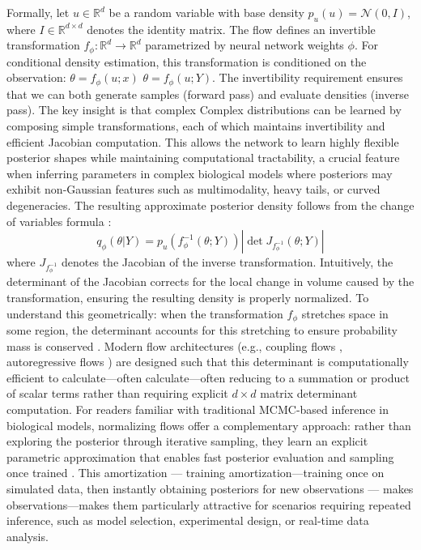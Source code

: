 \documentclass{article}
\providecommand{\DIFaddtex}[1]{{\protect\color{blue} \sf #1}} %
\providecommand{\DIFdeltex}[1]{{\protect\color{red} \scriptsize #1}} %
\providecommand{\DIFaddbegin}{} %
\providecommand{\DIFaddend}{} %
\providecommand{\DIFdelbegin}{} %
\providecommand{\DIFdelend}{} %
\providecommand{\DIFadd}[1]{\texorpdfstring{\DIFaddtex{#1}}{#1}} %
\providecommand{\DIFdel}[1]{\texorpdfstring{\DIFdeltex{#1}}{}} %
\newcommand{\DIFscaledelfig}{0.5}
\newlength{\DIFdelgraphicswidth} %
\newlength{\DIFdelgraphicsheight} %
\newcommand{\DIFaddincludegraphics}[2][]{{\color{blue}\fbox{\DIFOincludegraphics[#1]{#2}}}} %
\newcommand{\DIFdelincludegraphics}[2][]{%
\sbox{\DIFdelgraphicsbox}{\DIFOincludegraphics[#1]{#2}}%
\settoboxwidth{\DIFdelgraphicswidth}{\DIFdelgraphicsbox} %
\settoboxtotalheight{\DIFdelgraphicsheight}{\DIFdelgraphicsbox} %
\scalebox{\DIFscaledelfig}{%
\parbox[b]{\DIFdelgraphicswidth}{\usebox{\DIFdelgraphicsbox}\\[-\baselineskip] \rule{\DIFdelgraphicswidth}{0em}}\llap{\resizebox{\DIFdelgraphicswidth}{\DIFdelgraphicsheight}{%
\setlength{\unitlength}{\DIFdelgraphicswidth}%
\begin{picture}(1,1)%
\thicklines\linethickness{2pt} %
{\color[rgb]{1,0,0}\put(0,0){\framebox(1,1){}}}%
{\color[rgb]{1,0,0}\put(0,0){\line( 1,1){1}}}%
{\color[rgb]{1,0,0}\put(0,1){\line(1,-1){1}}}%
\end{picture}%
}\hspace*{3pt}}} %
} %
\DeclareRobustCommand{\DIFaddbegin}{\DIFOaddbegin \let\includegraphics\DIFaddincludegraphics} %
\DeclareRobustCommand{\DIFaddend}{\DIFOaddend \let\includegraphics\DIFOincludegraphics} %
\DeclareRobustCommand{\DIFdelbegin}{\DIFOdelbegin \let\includegraphics\DIFdelincludegraphics} %
\DeclareRobustCommand{\DIFdelend}{\DIFOaddend \let\includegraphics\DIFOincludegraphics} %
\begin{document}
Formally, let $u \in \mathbb{R}^d$ be a random variable with base density $p_u(u) = \mathcal{N}(0, I)$, where $I \in \mathbb{R}^{d \times d}$ denotes the identity matrix. The flow defines an invertible transformation $f_\phi: \mathbb{R}^d \rightarrow \mathbb{R}^d$ parametrized by neural network weights $\phi$. For conditional density estimation, this transformation is conditioned on the observation: \DIFdelbegin \DIFdel{$\theta = f_\phi(u; x)$}\DIFdelend \DIFaddbegin \DIFadd{$\theta = f_\phi(u; Y)$}\DIFaddend . The invertibility requirement ensures that we can both generate samples (forward pass) and evaluate densities (inverse pass). \DIFdelbegin \DIFdel{The key insight is that complex }\DIFdelend \DIFaddbegin \DIFadd{Complex }\DIFaddend distributions can be learned by composing simple transformations, each of which maintains invertibility and efficient Jacobian computation. This allows the network to learn highly flexible posterior shapes while maintaining computational tractability, a crucial feature when inferring parameters in complex biological models where posteriors may exhibit non-Gaussian features such as multimodality, heavy tails, or curved degeneracies. The resulting approximate posterior density follows from the change of variables formula
\DIFdelbegin \DIFdel{:
}\DIFdelend \begin{equation}
	q_\phi(\theta | Y) = p_u(f_\phi^{-1}(\theta;Y)) \left| \det J_{f_\phi^{-1}}(\theta; Y) \right|
\end{equation}
where $J_{f_\phi^{-1}}$ denotes the Jacobian of the inverse transformation. Intuitively, the determinant of the Jacobian corrects for the local change in volume caused by the transformation, ensuring the resulting density is properly normalized. To understand this geometrically: when the transformation $f_{\phi}$
stretches space in some region, the determinant accounts for this stretching to ensure probability mass is conserved \cite{papamakarios2021normalizing}. Modern flow architectures (e.g., coupling flows \cite{dinh2016density}, autoregressive flows \cite{papamakarios2017masked}) are designed such that this determinant is computationally efficient to \DIFdelbegin \DIFdel{calculate—often }\DIFdelend \DIFaddbegin \DIFadd{calculate---often }\DIFaddend reducing to a summation or product of scalar terms rather than requiring explicit $d \times d$ matrix determinant computation. For readers familiar with traditional MCMC-based inference in biological models, normalizing flows offer a complementary approach: rather than exploring the posterior through iterative sampling, they learn an explicit parametric approximation that enables fast posterior evaluation and sampling once trained \cite{Cranmer2020FrontierSBI}. This \DIFdelbegin \DIFdel{amortization — training }\DIFdelend \DIFaddbegin \DIFadd{amortization---training }\DIFaddend once on simulated data, then instantly obtaining posteriors for new \DIFdelbegin \DIFdel{observations — makes }\DIFdelend \DIFaddbegin \DIFadd{observations---makes }\DIFaddend them particularly attractive for scenarios requiring repeated inference, such as model selection, experimental design, or real-time data analysis.
\end{document}
